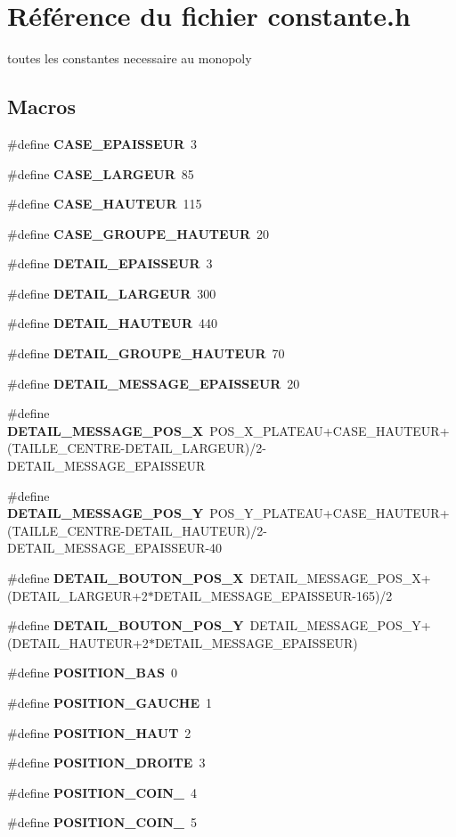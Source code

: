 \section{R\'{e}f\'{e}rence du fichier constante.h}
\label{constante_8h}
toutes les constantes necessaire au monopoly 

\subsection*{Macros}
\begin{CompactItemize}
\item 
\#define {\bf CASE\_\-EPAISSEUR}~3
\item 
\#define {\bf CASE\_\-LARGEUR}~85
\item 
\#define {\bf CASE\_\-HAUTEUR}~115
\item 
\#define {\bf CASE\_\-GROUPE\_\-HAUTEUR}~20
\item 
\#define {\bf DETAIL\_\-EPAISSEUR}~3
\item 
\#define {\bf DETAIL\_\-LARGEUR}~300
\item 
\#define {\bf DETAIL\_\-HAUTEUR}~440
\item 
\#define {\bf DETAIL\_\-GROUPE\_\-HAUTEUR}~70
\item 
\#define {\bf DETAIL\_\-MESSAGE\_\-EPAISSEUR}~20
\item 
\#define {\bf DETAIL\_\-MESSAGE\_\-POS\_\-X}~POS\_\-X\_\-PLATEAU+CASE\_\-HAUTEUR+(TAILLE\_\-CENTRE-DETAIL\_\-LARGEUR)/2-DETAIL\_\-MESSAGE\_\-EPAISSEUR
\item 
\#define {\bf DETAIL\_\-MESSAGE\_\-POS\_\-Y}~POS\_\-Y\_\-PLATEAU+CASE\_\-HAUTEUR+(TAILLE\_\-CENTRE-DETAIL\_\-HAUTEUR)/2-DETAIL\_\-MESSAGE\_\-EPAISSEUR-40
\item 
\#define {\bf DETAIL\_\-BOUTON\_\-POS\_\-X}~DETAIL\_\-MESSAGE\_\-POS\_\-X+(DETAIL\_\-LARGEUR+2$\ast$DETAIL\_\-MESSAGE\_\-EPAISSEUR-165)/2
\item 
\#define {\bf DETAIL\_\-BOUTON\_\-POS\_\-Y}~DETAIL\_\-MESSAGE\_\-POS\_\-Y+(DETAIL\_\-HAUTEUR+2$\ast$DETAIL\_\-MESSAGE\_\-EPAISSEUR)
\item 
\#define {\bf POSITION\_\-BAS}~0
\item 
\#define {\bf POSITION\_\-GAUCHE}~1
\item 
\#define {\bf POSITION\_\-HAUT}~2
\item 
\#define {\bf POSITION\_\-DROITE}~3
\item 
\#define {\bf POSITION\_\-COIN\_}~4
\item 
\#define {\bf POSITION\_\-COIN\_}~5

\end{CompactItemize}
